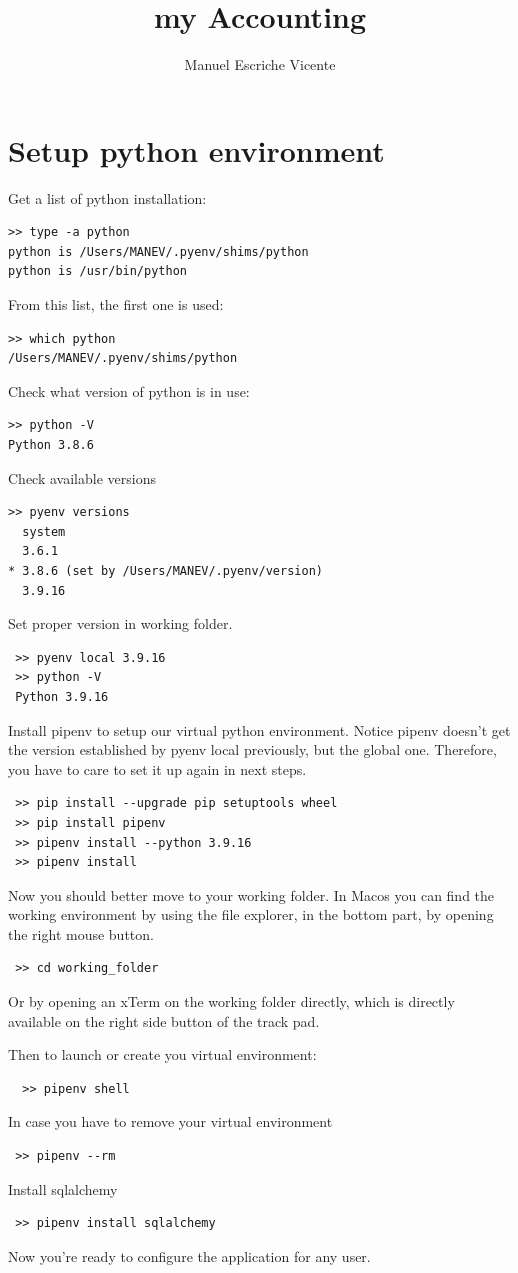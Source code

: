 \documentclass[12pt, a4paper]{article}
\title{my Accounting}
\author{Manuel Escriche Vicente}
\begin{document}
\maketitle
\begin{abstract}

\end{abstract}
\tableofcontents
\newpage

\section{Setup python environment}
Get a list of python installation:
\begin{verbatim}
>> type -a python
python is /Users/MANEV/.pyenv/shims/python
python is /usr/bin/python
\end{verbatim}
From this list, the first one is used:
\begin{verbatim}
>> which python
/Users/MANEV/.pyenv/shims/python
\end{verbatim}
Check what version of python is in use:
\begin{verbatim}
>> python -V
Python 3.8.6
\end{verbatim}
Check available versions
\begin{verbatim}
>> pyenv versions
  system
  3.6.1
* 3.8.6 (set by /Users/MANEV/.pyenv/version)
  3.9.16
\end{verbatim}
Set proper version in working folder.  
\begin{verbatim}
 >> pyenv local 3.9.16
 >> python -V 
 Python 3.9.16
 \end{verbatim}
 Install pipenv to setup our virtual python environment. Notice pipenv doesn't get the version established by pyenv local previously, but the global one. Therefore, you have to care to set it up again in next steps.
 \begin{verbatim}
 >> pip install --upgrade pip setuptools wheel
 >> pip install pipenv
 >> pipenv install --python 3.9.16
 >> pipenv install
 \end{verbatim}
 Now you should better move to your working folder. In Macos you can find the working environment by using the file explorer, in the bottom part, by opening the right mouse button. 
 \begin{verbatim}
 >> cd working_folder
 \end{verbatim}
 Or by opening an xTerm on the working folder directly, which is directly available on the right side button of the track pad.
 
 
 Then to launch or create you virtual environment:
 \begin{verbatim}
  >> pipenv shell
 \end{verbatim}
 In case you have to remove your virtual environment 
 \begin{verbatim}
 >> pipenv --rm
 \end{verbatim}
 Install sqlalchemy
 \begin{verbatim}
 >> pipenv install sqlalchemy
 \end{verbatim}
 Now you're ready to configure the application for any user.
 
\end{document}
